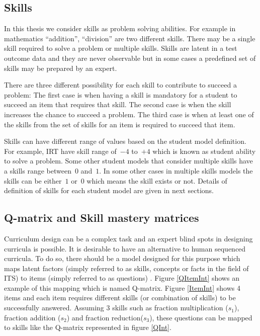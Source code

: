 \subsection{Skills}

In this thesis we consider skills as problem solving abilities. For example in mathematics ``addition'', ``division'' are two different skills. There may be a single skill required to solve a problem or multiple skills. Skills are latent in a test outcome data and they are never observable but in some cases a predefined set of skills may be prepared by an expert.

There are three different possibility for each skill to contribute to succeed a problem: The first case is when having a skill is mandatory for a student to succeed an item that requires that skill. The second case is when the skill increases the chance to succeed a problem. The third case is when at least one of the skills from the set of skills for an item is required to succeed that item.

Skills can have different range of values based on the student model definition. For example, IRT have skill range of~$-4$ to~$+4$ which is known as student ability to solve a problem. Some other student models that consider multiple skills have a skills range between~$0$ and~$1$. In some other cases in multiple skills models the skills can be either~$1$ or~$0$ which means the skill exists or not. Details of definition of skills for each student model are given in next sections.

\subsection{Q-matrix and Skill mastery matrices}


Curriculum design can be a complex task and an expert blind spots in designing curricula is possible. It is desirable to have an alternative to human sequenced curricula. To do so, there should be a model designed for this purpose which maps latent factors (simply referred to as skills, concepts or facts in the field of ITS) to items (simply referred to as questions) \citep{Tatsuoka1983,Tatsuoka2009}. Figure \ref{QItemInt} shows an example of this mapping which is named  Q-matrix.  Figure \ref{ItemInt} shows 4 items and each item requires different skills (or combination of skills) to be successfully answered. Assuming 3 skills such as fraction multiplication ($s_{1}$), fraction addition ($s_{2}$) and fraction reduction($s_{3}$), these questions can be mapped to skills like the Q-matrix represented in figure \protect\ref{QInt}. 

